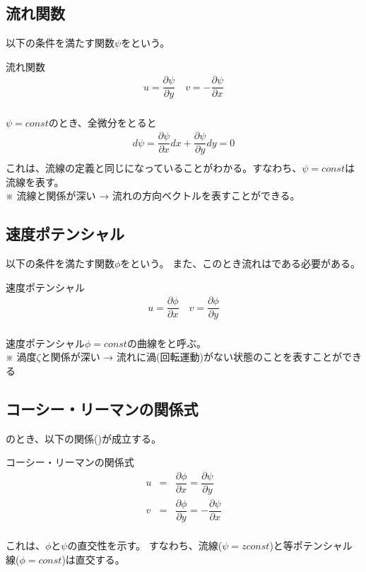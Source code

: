\documentclass[a4paper]{jsarticle}
\begin{document}
\subsection{流れ関数}
以下の条件を満たす関数$\psi$をという。
\begin{itembox}[l]{流れ関数}
    \begin{eqnarray*}
        u=\dfrac{\partial \psi}{\partial y}\quad v=-\dfrac{\partial \psi}{\partial x}\\
    \end{eqnarray*}
\end{itembox}
$\psi =const$のとき、全微分をとると\\
\begin{eqnarray*}
    d\psi = \dfrac{\partial \psi}{\partial x}dx+\dfrac{\partial \psi}{\partial y}dy=0\\
\end{eqnarray*}
これは、流線の定義と同じになっていることがわかる。すなわち、$\psi = const$は流線を表す。\\
※ 流線と関係が深い → 流れの方向ベクトルを表すことができる。
\subsection{速度ポテンシャル}
以下の条件を満たす関数$\phi$をという。
また、このとき流れはである必要がある。
\begin{itembox}[l]{速度ポテンシャル}
    \begin{eqnarray*}
        u=\dfrac{\partial \phi}{\partial x}\quad v=\dfrac{\partial \phi}{\partial y}\\
    \end{eqnarray*}
\end{itembox}
速度ポテンシャル$\phi = const$の曲線をと呼ぶ。\\
※ 渦度$\zeta$と関係が深い → 流れに渦(回転運動)がない状態のことを表すことができる
\subsection{コーシー・リーマンの関係式}
のとき、以下の関係()が成立する。
\begin{itembox}[l]{コーシー・リーマンの関係式}
    \begin{eqnarray*}
        u&=&\dfrac{\partial \phi}{\partial x}=\dfrac{\partial \psi}{\partial y}\\
        v&=&\dfrac{\partial \phi}{\partial y}=-\dfrac{\partial \psi}{\partial x}\\
    \end{eqnarray*}
\end{itembox}
これは、$\phi$と$\psi$の直交性を示す。
すなわち、流線($\psi=zconst$)と等ポテンシャル線($\phi=const$)は直交する。
\end{document}
